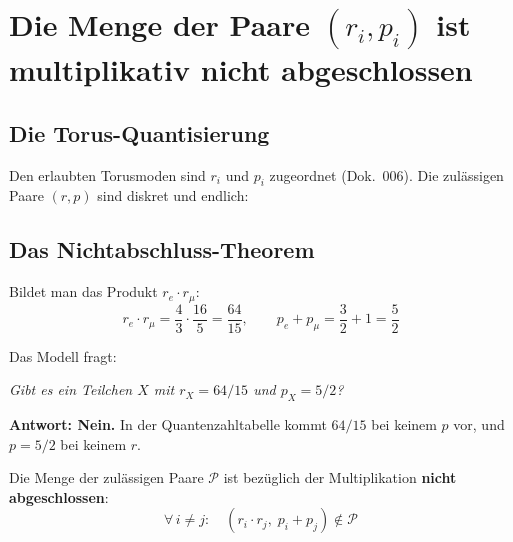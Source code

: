 \section{Die Menge der Paare \texorpdfstring{\texorpdfstring{\texorpdfstring{$(r_i,p_i)$}{(ri,pi)}}{(ri,pi)}}{(ri,pi)} ist multiplikativ nicht abgeschlossen}

\subsection{Die Torus-Quantisierung}

Den erlaubten Torusmoden sind $r_i$ und $p_i$ zugeordnet (Dok.~006). Die zulässigen Paare $(r,p)$
sind diskret und endlich:

\begin{center}
{\footnotesize
{}
}
\end{center}

\subsection{Das Nichtabschluss-Theorem}

Bildet man das Produkt $r_e \cdot r_\mu$:
\[
  r_e \cdot r_\mu = \frac{4}{3} \cdot \frac{16}{5} = \frac{64}{15},
  \qquad p_e + p_\mu = \frac{3}{2} + 1 = \frac{5}{2}
\]

Das Modell fragt:
\begin{center}
  \emph{Gibt es ein Teilchen $X$ mit $r_X = 64/15$ und $p_X = 5/2$?}
\end{center}

\textbf{Antwort: Nein.} In der Quantenzahltabelle kommt $64/15$ bei
keinem $p$ vor, und $p=5/2$ bei keinem $r$.

Die Menge der zulässigen Paare $\mathcal{P}$ ist bezüglich der
Multiplikation \textbf{nicht abgeschlossen}:
\begin{equation}
  \forall\, i \neq j:\quad (r_i \cdot r_j,\; p_i + p_j) \notin \mathcal{P}
  \label{eq:nichtabschluss}
\end{equation}

